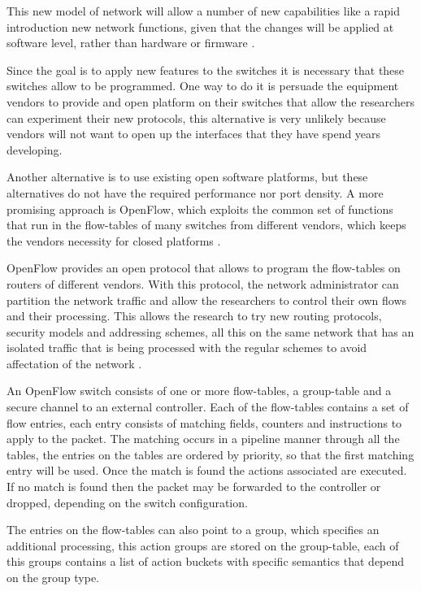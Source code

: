 This new model of network will allow a number of new capabilities like a rapid introduction new network functions, given that the changes will be applied at software level, rather than hardware or firmware \cite{li2013software}.

Since the goal is to apply new features to the switches it is necessary that these switches allow to be programmed. One way to do it is persuade the equipment vendors to provide and open platform on their switches that allow the researchers can experiment their new protocols, this alternative is very unlikely because vendors will not want to open up the interfaces that they have spend years developing.

Another alternative is to use existing open software platforms, but these alternatives do not have the required performance nor port density. A more promising approach is OpenFlow, which exploits the common set of functions that run in the flow-tables of many switches from different vendors, which keeps the vendors necessity for closed platforms \cite{mckeown2008openflow}.

OpenFlow provides an open protocol that allows to program the flow-tables on routers of different vendors. With this protocol, the network administrator can partition the network traffic and allow the researchers to control their own flows and their processing. This allows the research to try new routing protocols, security models and addressing schemes, all this on the same network that has an isolated traffic that is being processed with the regular schemes to avoid affectation of the network \cite{mckeown2008openflow}.

An OpenFlow switch consists of one or more flow-tables, a group-table and a secure channel to an external controller. Each of the flow-tables contains a set of flow entries, each entry consists of matching fields, counters and instructions to apply to the packet. The matching occurs in a pipeline manner through all the tables, the entries on the tables are ordered by priority, so that the first matching entry will be used. Once the match is found the actions associated are executed. If no match is found then the packet may be forwarded to the controller or dropped, depending on the switch configuration.

The entries on the flow-tables can also point to a group, which specifies an additional processing, this action groups are stored on the group-table, each of this groups contains a list of action buckets with specific semantics that depend on the group type.


